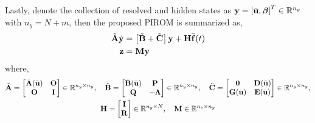 Lastly, denote the collection of resolved and hidden states as $\mathbf{y} = \left[\bar{\mathbf{u}},\boldsymbol{\beta}\right]^T\in\mathbb{R}^{n_y}$ with $n_y = N+m$, then the proposed PIROM is summarized as,
\begin{subequations}
    \begin{align}
        \tilde{\mathbf{A}}\dot{\mathbf{y}} &= \left[\tilde{\mathbf{B}} +\tilde{\mathbf{C}}\right]\mathbf{y} + \mathbf{H}\bar{\mathbf{f}}(t)\\
        \mathbf{z} &= \mathbf{M}\mathbf{y}
    \end{align}\label{eqn_pirom_general}
\end{subequations}
where,
\begin{subequations}
    \begin{gather}
        \tilde{\mathbf{A}} = \begin{bmatrix}
            \bar{\mathbf{A}}(\bar{\mathbf{u}}) & \mathbf{O}\\
            \mathbf{O} & \mathbf{I}
        \end{bmatrix}\in\mathbb{R}^{n_y\times n_y},\quad \tilde{\mathbf{B}} = \begin{bmatrix}
            \bar{\mathbf{B}}(\bar{\mathbf{u}}) & \mathbf{P}\\
            \mathbf{Q} & -\boldsymbol{\Lambda}
        \end{bmatrix}\in\mathbb{R}^{n_y\times n_y},\quad \tilde{\mathbf{C}} = \begin{bmatrix}
            \boldsymbol{0} & \mathbf{D}(\bar{\mathbf{u}})\\
            \mathbf{G}(\bar{\mathbf{u}}) & \mathbf{E}(\bar{\mathbf{u}})
        \end{bmatrix}\in\mathbb{R}^{n_y\times n_y},\\
        \mathbf{H} = \begin{bmatrix}
            \mathbf{I} \\
            \mathbf{R}
        \end{bmatrix}\in\mathbb{R}^{n_y\times N},\quad  \mathbf{M}\in\mathbb{R}^{n_z\times n_y}
    \end{gather}
\end{subequations}

